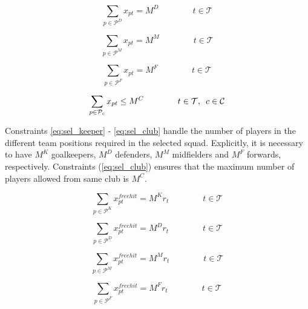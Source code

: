 \begin{equation} \label{eq_sel_defender}
    \sum_{p \in \mathcal{P}^{D}} x_{pt} = M^{D} \qquad\qquad t \in \mathcal{T}
\end{equation}


\begin{equation} \label{eq:sel_midfielder}
    \sum_{p \in \mathcal{P}^{M}} x_{pt} = M^{M} \qquad\qquad t \in \mathcal{T}
\end{equation}

\begin{equation} \label{eq:sel_forward}
    \sum_{p \in \mathcal{P}^{F}} x_{pt} = M^{F} \qquad\qquad t \in \mathcal{T}
\end{equation}

\begin{equation} \label{eq:sel_club}
    \sum_{p \in \mathcal{P}_{c}} x_{pt} \leq M^{C} \qquad\qquad t \in \mathcal{T}, \enskip   c \in \mathcal{C}
\end{equation}

Constraints \eqref{eq:sel_keeper} - \eqref{eq:sel_club} handle the number of players in the different team positions required in the selected squad. Explicitly, it is necessary to have $M^{K}$ goalkeepers, $M^{D}$ defenders, $M^{M}$ midfielders and $M^{F}$ forwards, respectively. Constraints (\ref{eq:sel_club}) ensures that the maximum number of players allowed from same club is $M^{C}$. 

\begin{equation} \label{eq:free_hit_sel_keeper}
    \sum_{p \in \mathcal{P}^{K}} x_{pt}^{free hit} = M^{K}r_{t}  \qquad\qquad t \in \mathcal{T}
\end{equation}

\begin{equation} \label{eq:free_hit_sel_defender}
    \sum_{p \in \mathcal{P}^{D}} x_{pt}^{free hit} = M^{D}r_{t} \qquad\qquad t \in \mathcal{T}
\end{equation}

\begin{equation} \label{eq:free_hit_sel_midfielder}
    \sum_{p \in \mathcal{P}^{M}} x_{pt}^{free hit} = M^{M}r_{t} \qquad\qquad t \in \mathcal{T}
\end{equation}

\begin{equation} \label{eq:free_hit_sel_forward}
    \sum_{p \in \mathcal{P}^{F}} x_{pt}^{free hit} = M^{F}r_{t} \qquad\qquad t \in \mathcal{T}
\end{equation}

